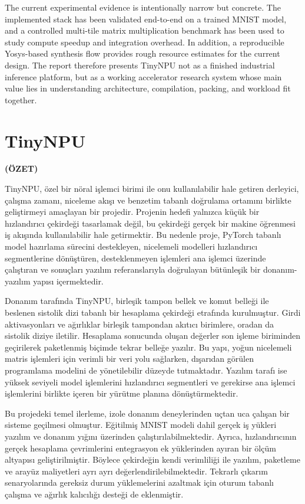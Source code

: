 \documentclass[a4paper, 12pt, titlepage]{article}
\newcommand{\theturkishtitle}{TinyNPU}
\begin{document}
The current experimental evidence is intentionally narrow but concrete. The implemented stack has been validated end-to-end on a trained MNIST model, and a controlled multi-tile matrix multiplication benchmark has been used to study compute speedup and integration overhead. In addition, a reproducible Yosys-based synthesis flow provides rough resource estimates for the current design. The report therefore presents TinyNPU not as a finished industrial inference platform, but as a working accelerator research system whose main value lies in understanding architecture, compilation, packing, and workload fit together.

\newpage
\section*{\centering\theturkishtitle}
\centerline{\fontsize{16pt}{21.6pt}\sffamily\bfseries (ÖZET)}
TinyNPU, özel bir nöral işlemci birimi ile onu kullanılabilir hale getiren derleyici, çalışma zamanı, niceleme akışı ve benzetim tabanlı doğrulama ortamını birlikte geliştirmeyi amaçlayan bir projedir. Projenin hedefi yalnızca küçük bir hızlandırıcı çekirdeği tasarlamak değil, bu çekirdeği gerçek bir makine öğrenmesi iş akışında kullanılabilir hale getirmektir. Bu nedenle proje, PyTorch tabanlı model hazırlama sürecini destekleyen, nicelemeli modelleri hızlandırıcı segmentlerine dönüştüren, desteklenmeyen işlemleri ana işlemci üzerinde çalıştıran ve sonuçları yazılım referanslarıyla doğrulayan bütünleşik bir donanım-yazılım yapısı içermektedir.

Donanım tarafında TinyNPU, birleşik tampon bellek ve komut belleği ile beslenen sistolik dizi tabanlı bir hesaplama çekirdeği etrafında kurulmuştur. Girdi aktivasyonları ve ağırlıklar birleşik tampondan akıtıcı birimlere, oradan da sistolik diziye iletilir. Hesaplama sonucunda oluşan değerler son işleme biriminden geçirilerek paketlenmiş biçimde tekrar belleğe yazılır. Bu yapı, yoğun nicelemeli matris işlemleri için verimli bir veri yolu sağlarken, dışarıdan görülen programlama modelini de yönetilebilir düzeyde tutmaktadır. Yazılım tarafı ise yüksek seviyeli model işlemlerini hızlandırıcı segmentleri ve gerekirse ana işlemci işlemlerini birlikte içeren bir yürütme planına dönüştürmektedir.

Bu projedeki temel ilerleme, izole donanım deneylerinden uçtan uca çalışan bir sisteme geçilmesi olmuştur. Eğitilmiş MNIST modeli dahil gerçek iş yükleri yazılım ve donanım yığını üzerinden çalıştırılabilmektedir. Ayrıca, hızlandırıcının gerçek hesaplama çevrimlerini entegrasyon ek yüklerinden ayıran bir ölçüm altyapısı geliştirilmiştir. Böylece çekirdeğin kendi verimliliği ile yazılım, paketleme ve arayüz maliyetleri ayrı ayrı değerlendirilebilmektedir. Tekrarlı çıkarım senaryolarında gereksiz durum yüklemelerini azaltmak için oturum tabanlı çalışma ve ağırlık kalıcılığı desteği de eklenmiştir.
\end{document}
